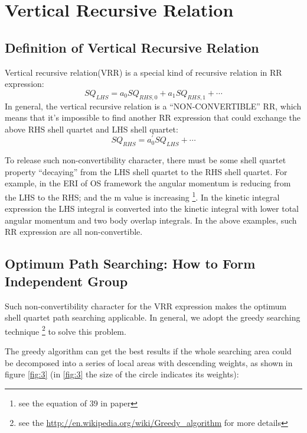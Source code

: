 \section{Vertical Recursive Relation}
%
%
\subsection{Definition of Vertical Recursive Relation}
%
%
\label{vrr}
Vertical recursive relation(VRR) is a special kind of recursive relation
in RR expression:
\begin{equation}
 SQ_{LHS}  = a_{0}SQ_{RHS,0} + a_{1}SQ_{RHS,1} + \cdots
\end{equation}
In general, the vertical recursive relation is a ``NON-CONVERTIBLE''
RR, which means that it's impossible to find another RR expression that could 
exchange the above RHS shell quartet and LHS shell quartet:
\begin{equation}
 SQ_{RHS} = a_{0}^{'}SQ_{LHS} + \cdots
\end{equation}

To release such non-convertibility character, there must be some 
shell quartet property ``decaying'' from the LHS shell quartet
to the RHS shell quartet. For example, in the ERI of OS framework
the angular momentum is reducing from the LHS to the RHS; and the 
m value is increasing \footnote{see the equation of 39 in \cite{OS1986}
paper}. In the kinetic integral expression the LHS integral
is converted into the kinetic integral with lower total angular momentum
and two body overlap integrals. In the above examples, such RR 
expression are all non-convertible.

\subsection{Optimum Path Searching: How to Form Independent Group}
%
%
\label{vrr_sq_search}

Such non-convertibility character for the VRR expression makes 
the optimum shell quartet path searching applicable. In general,
we adopt the greedy searching technique \footnote{see the 
\url{http://en.wikipedia.org/wiki/Greedy_algorithm} for more 
details} to solve this problem. 

The greedy algorithm can get the best results if the whole searching
area could be decomposed into a series of local areas with descending 
weights, as shown in figure \ref{fig:3} (in \ref{fig:3} the size 
of the circle indicates its weights):

